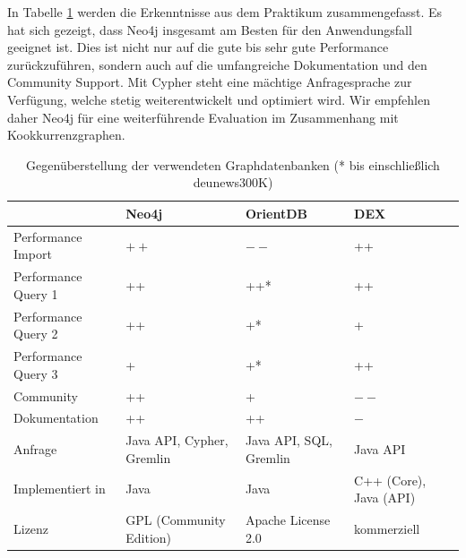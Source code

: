 \documentclass[11pt, a4paper, oneside]{article} %
\begin{document}
In Tabelle \ref{tab:compare} werden die Erkenntnisse aus dem Praktikum zusammengefasst. Es hat sich gezeigt, dass Neo4j insgesamt am Besten für den Anwendungsfall geeignet ist. Dies ist nicht nur auf die gute bis sehr gute Performance zurückzuführen, sondern auch auf die umfangreiche Dokumentation und den Community Support. Mit Cypher steht eine mächtige Anfragesprache zur Verfügung, welche stetig weiterentwickelt und optimiert wird. Wir empfehlen daher Neo4j für eine weiterführende Evaluation im Zusammenhang mit Kookkurrenzgraphen.

\renewcommand{\arraystretch}{1.5}

\begin{table}[ht]
\begin{tabular}{|l||p{2.5cm}|p{2.5cm}|p{2.5cm}|}
\hline 
 & \textbf{Neo4j} & \textbf{OrientDB} & \textbf{DEX} \\ 
\hline
Performance Import & $++$ & $--$ & ++ \\ 
\hline 
Performance Query 1 & ++ & ++* & ++ \\ 
\hline 
Performance Query 2 & ++ & +* & + \\ 
\hline 
Performance Query 3 & + & +* & ++ \\ 
\hline
Community & ++ & + & $--$ \\ 
\hline 
Dokumentation & ++ & ++ & $-$ \\
\hline 
Anfrage & Java API, Cypher, Gremlin & Java API, SQL, Gremlin & Java API \\
\hline
Implementiert in & Java & Java & C++ (Core), Java (API) \\
\hline 
Lizenz & GPL (Community Edition) & Apache License 2.0 & kommerziell	 \\ 
\hline 
\end{tabular}
\caption{Gegenüberstellung der verwendeten Graphdatenbanken (* bis einschließlich deu\textunderscore news\textunderscore 300K)}
\label{tab:compare}
\end{table}

\newpage
\onecolumn
\end{document}
